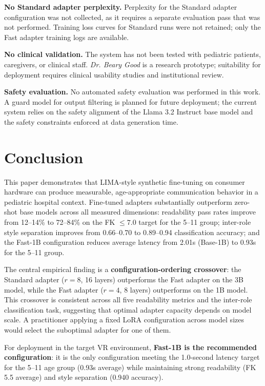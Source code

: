 \documentclass[journal]{IEEEtai}
\begin{document}
\textbf{No Standard adapter perplexity.} Perplexity for the Standard adapter configuration was not collected, as it requires a separate evaluation pass that was not performed. Training loss curves for Standard runs were not retained; only the Fast adapter training logs are available.

\textbf{No clinical validation.} The system has not been tested with pediatric patients, caregivers, or clinical staff. \textit{Dr. Beary Good} is a research prototype; suitability for deployment requires clinical usability studies and institutional review.

\textbf{Safety evaluation.} No automated safety evaluation was performed in this work. A guard model for output filtering is planned for future deployment; the current system relies on the safety alignment of the Llama 3.2 Instruct base model and the safety constraints enforced at data generation time.

\section{Conclusion}

This paper demonstrates that LIMA-style synthetic fine-tuning on consumer hardware can produce measurable, age-appropriate communication behavior in a pediatric hospital context. Fine-tuned adapters substantially outperform zero-shot base models across all measured dimensions: readability pass rates improve from 12--14\% to 72--84\% on the FK $\leq 7.0$ target for the 5--11 group; inter-role style separation improves from 0.66--0.70 to 0.89--0.94 classification accuracy; and the Fast-1B configuration reduces average latency from 2.01s (Base-1B) to 0.93s for the 5--11 group.

The central empirical finding is a \textbf{configuration-ordering crossover}: the Standard adapter ($r = 8$, 16 layers) outperforms the Fast adapter on the 3B model, while the Fast adapter ($r = 4$, 8 layers) outperforms on the 1B model. This crossover is consistent across all five readability metrics and the inter-role classification task, suggesting that optimal adapter capacity depends on model scale. A practitioner applying a fixed LoRA configuration across model sizes would select the suboptimal adapter for one of them.

For deployment in the target VR environment, \textbf{Fast-1B is the recommended configuration}: it is the only configuration meeting the 1.0-second latency target for the 5--11 age group (0.93s average) while maintaining strong readability (FK 5.5 average) and style separation (0.940 accuracy).
\end{document}
